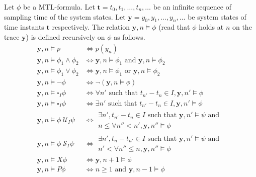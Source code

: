\begin{definition}
  Let $\phi$ be a MTL-formula.
  Let $\mathbf{t} = t_0, t_1, \ldots, t_n, \ldots$ be an infinite sequence of sampling time of the system states.
  Let $\mathbf{y} = y_0, y_1, \ldots, y_n, \ldots$ be system states of time instants $\mathbf{t}$ respectively.
  The relation $\mathbf{y}, n \models \phi$ (read that $\phi$ holds at $n$ on the trace $\mathbf{y}$) is defined recursively on $\phi$ as follows.
  \begin{align}
    \mathbf{y}, n \models p &\iff p(y_n)\\
    \mathbf{y}, n \models \phi_1 \wedge \phi_2 &\iff \mathbf{y}, n \models \phi_1 \text{ and } \mathbf{y}, n \models \phi_2\\
    \mathbf{y}, n \models \phi_1 \vee \phi_2 &\iff \mathbf{y}, n \models \phi_1 \text{ or } \mathbf{y}, n \models \phi_2\\
    \mathbf{y}, n \models \neg \phi &\iff \neg (\mathbf{y}, n \models \phi)\\
    \mathbf{y}, n \models \square_I \phi &\iff \forall n'\text{ such that } t_{n'} - t_n \in I, \mathbf{y}, n' \models \phi\\
    \mathbf{y}, n \models \square_I \phi &\iff \exists n' \text{ such that } t_{n'} - t_n \in I, \mathbf{y}, n' \models \phi\\
    \mathbf{y}, n \models \phi \ \mathcal{U}_I \psi &\iff
    \begin{gathered}
      \exists n', t_{n'} - t_n \in I \text{ such that } \mathbf{y}, n' \models \psi \text{ and }\\
       n \leq \forall n'' < n', \mathbf{y}, n'' \models \phi
    \end{gathered}\\
    \mathbf{y}, n \models \phi \ \mathcal{S}_I \psi &\iff
    \begin{gathered}
      \exists n', t_n - t_{n'} \in I \text{ such that } \mathbf{y}, n' \models \psi \text{ and }\\
      n' < \forall n'' \leq n, \mathbf{y}, n'' \models \phi
    \end{gathered}\\
    \mathbf{y}, n \models X\phi &\iff \mathbf{y}, n+1 \models \phi\\
    \mathbf{y}, n \models P\phi &\iff n \geq 1 \text{ and } \mathbf{y}, n-1 \models \phi
  \end{align}
\end{definition}


